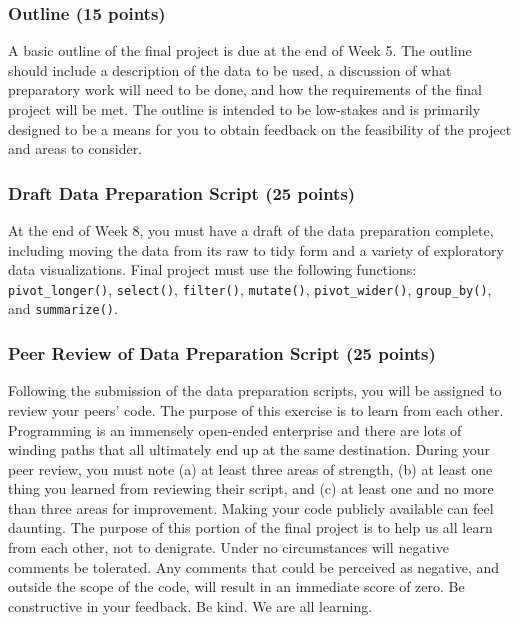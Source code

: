 \documentclass[
  letterpaper,
  DIV=11,
  numbers=noendperiod]{scrartcl}
\begin{document}
\hypertarget{outline-15-points}{%
\subsubsection{Outline (15 points)}\label{outline-15-points}}

A basic outline of the final project is due at the end of Week 5. The
outline should include a description of the data to be used, a
discussion of what preparatory work will need to be done, and how the
requirements of the final project will be met. The outline is intended
to be low-stakes and is primarily designed to be a means for you to
obtain feedback on the feasibility of the project and areas to consider.

\hypertarget{draft-data-preparation-script-25-points}{%
\subsubsection{Draft Data Preparation Script (25
points)}\label{draft-data-preparation-script-25-points}}

At the end of Week 8, you must have a draft of the data preparation
complete, including moving the data from its raw to tidy form and a
variety of exploratory data visualizations. Final project must use the
following functions: \texttt{pivot\_longer()}, \texttt{select()},
\texttt{filter()}, \texttt{mutate()}, \texttt{pivot\_wider()},
\texttt{group\_by()}, and \texttt{summarize()}.

\hypertarget{peer-review-of-data-preparation-script-25-points}{%
\subsubsection{Peer Review of Data Preparation Script (25
points)}\label{peer-review-of-data-preparation-script-25-points}}

Following the submission of the data preparation scripts, you will be
assigned to review your peers' code. The purpose of this exercise is to
learn from each other. Programming is an immensely open-ended enterprise
and there are lots of winding paths that all ultimately end up at the
same destination. During your peer review, you must note (a) at least
three areas of strength, (b) at least one thing you learned from
reviewing their script, and (c) at least one and no more than three
areas for improvement. Making your code publicly available can feel
daunting. The purpose of this portion of the final project is to help us
all learn from each other, not to denigrate. Under no circumstances will
negative comments be tolerated. Any comments that could be perceived as
negative, and outside the scope of the code, will result in an immediate
score of zero. Be constructive in your feedback. Be kind. We are all
learning.
\end{document}
